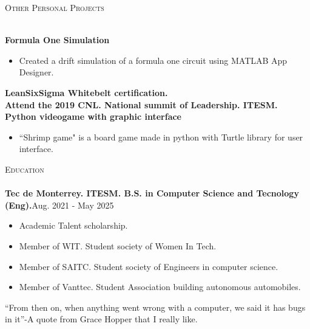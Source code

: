 \documentclass[a4paper]{article}
\newcommand{\lineunder} {
    \vspace*{-8pt} \\
    \hspace*{-18pt} \hrulefill \\
}
\newcommand{\header} [1] {
        {\hspace*{-18pt}\vspace*{6pt} \textsc{#1}}
    \vspace*{-6pt} \lineunder
}
\begin{document}
    \header{Other Personal Projects}
    \vspace{1mm}

    {\textbf{Formula One Simulation}} \\
    \vspace{-1mm}
    \begin{itemize} \itemsep 1pt
    \item Created a drift simulation of a formula one circuit using MATLAB App Designer.
    \end{itemize}
    \vspace{-1mm}
    {\textbf{LeanSixSigma Whitebelt certification.}}\\
    \vspace{2mm}
    {\textbf{Attend the 2019 CNL. National summit of Leadership. ITESM.}}\\
    \vspace{2mm}
    {\textbf{Python videogame with graphic interface}}
    \vspace{-1mm}
    \begin{itemize} \itemsep 1pt
    \item “Shrimp game" is a board game made in python with Turtle library for user interface.
    \end{itemize}


    \header{Education}
    \vspace{1mm}
    \textbf{Tec de Monterrey. ITESM. B.S. in Computer Science and Tecnology (Eng).}\hfill Aug. 2021 - May 2025\\
    \begin{itemize} \itemsep -1pt
    \item Academic Talent scholarship.
    \item Member of WIT. Student society of Women In Tech.
    \item Member of SAITC. Student society of Engineers in computer science.
    \item Member of Vanttec. Student Association building autonomous automobiles.
    \end{itemize}
    \vspace{2mm}
    “From then on, when anything went wrong with a computer, we said it has bugs in it”-A quote from Grace Hopper that I really like.
\end{document}
